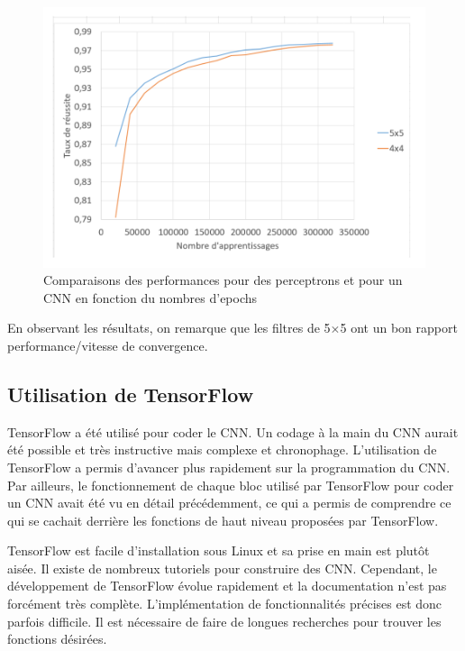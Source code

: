 \newpage

\begin{figure}[h]
    \center 
    \includegraphics{img/comparaison_filtres.png}
    \caption{Comparaisons des performances pour des perceptrons et pour un CNN en fonction du nombres d'epochs}
\end{figure}

En observant les résultats, on remarque que les filtres de 5$\times$5 ont un bon rapport performance/vitesse de convergence.

\newpage

\subsection{Utilisation de TensorFlow}

TensorFlow a été utilisé pour coder le CNN. Un codage à la main du CNN aurait été possible et très instructive mais complexe et chronophage. L'utilisation de TensorFlow a permis d'avancer plus rapidement sur la programmation du CNN. Par ailleurs, le fonctionnement de chaque bloc utilisé par TensorFlow pour coder un CNN avait été vu en détail précédemment, ce qui a permis de comprendre ce qui se cachait derrière les fonctions de haut niveau proposées par TensorFlow.

TensorFlow est facile d'installation sous Linux et sa prise en main est plutôt aisée. Il existe de nombreux tutoriels pour construire des CNN. Cependant, le développement de TensorFlow évolue rapidement et la documentation n'est pas forcément très complète. L'implémentation de fonctionnalités précises est donc parfois difficile. Il est nécessaire de faire de longues recherches pour trouver les fonctions désirées.

